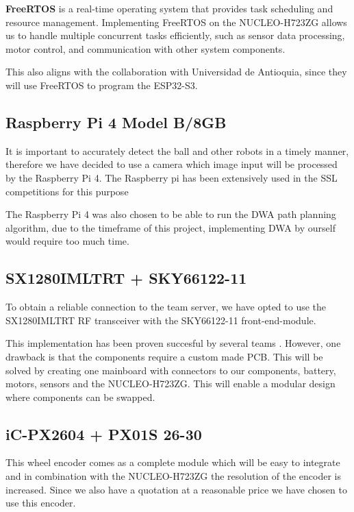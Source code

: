 \documentclass[a4paper,12pt]{article}
\begin{document}
  \textbf{FreeRTOS} is a real-time operating system that provides task
  scheduling and resource management. Implementing FreeRTOS on the
  NUCLEO-H723ZG allows us to handle multiple concurrent tasks
  efficiently, such as sensor data processing, motor control, and
  communication with other system components.

  This also aligns with the collaboration with Universidad de Antioquia,
  since they will use FreeRTOS to program the ESP32-S3.

  \subsection*{Raspberry Pi 4 Model B/8GB}

  It is important to accurately detect the ball and other robots in a
  timely manner, therefore we have decided to use a camera which image
  input will be processed by the Raspberry Pi 4. The Raspberry pi has
  been extensively used in the SSL competitions for this purpose
  \cite{ommerExtendedTeamDescription}\cite{satoGreenTea2024Team}

  The Raspberry Pi 4 was also chosen to be able to run the DWA path
  planning algorithm, due to the timeframe of this project, implementing
  DWA by ourself would require too much time.

  \subsection*{SX1280IMLTRT + SKY66122-11}

  To obtain a reliable connection to the team server, we have opted to
  use the SX1280IMLTRT RF transceiver with the SKY66122-11
  front-end-module.

  This implementation has been proven succesful by several teams \cite{ryllExtendedTeamDescription}\cite{barretoRoboIMEIgnitingInnovation}.
  However, one drawback is that the components require a custom made
  PCB. This will be solved by creating one mainboard with connectors to
  our components, battery, motors, sensors and the NUCLEO-H723ZG. This
  will enable a modular design where components can be swapped.

  \subsection*{iC-PX2604 + PX01S 26-30}

  This wheel encoder comes as a complete module which will be easy to
  integrate and in combination with the NUCLEO-H723ZG the resolution of
  the encoder is increased. Since we also have a quotation at a
  reasonable price we have chosen to use this encoder.
\end{document}

